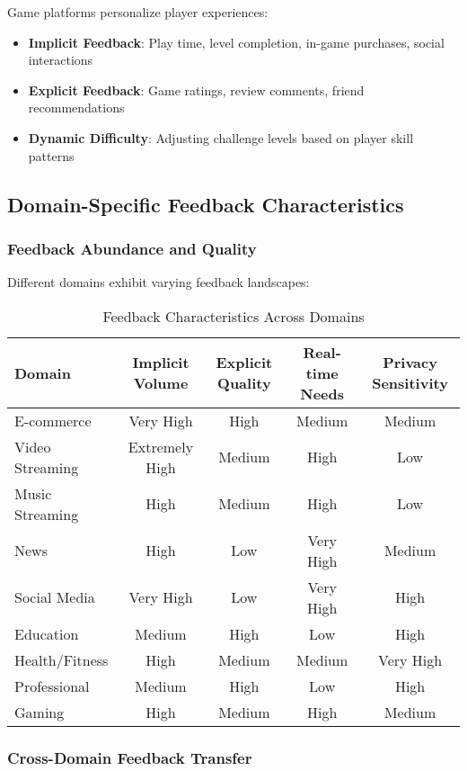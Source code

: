 Game platforms personalize player experiences:

\begin{itemize}
    \item \textbf{Implicit Feedback}: Play time, level completion, in-game purchases, social interactions
    \item \textbf{Explicit Feedback}: Game ratings, review comments, friend recommendations
    \item \textbf{Dynamic Difficulty}: Adjusting challenge levels based on player skill patterns
\end{itemize}

\subsection{Domain-Specific Feedback Characteristics}

\subsubsection{Feedback Abundance and Quality}

Different domains exhibit varying feedback landscapes:

\begin{table}[h]
\centering
\caption{Feedback Characteristics Across Domains}
\label{tab:domain_feedback}
\begin{tabular}{@{}lcccc@{}}
\toprule
Domain & Implicit Volume & Explicit Quality & Real-time Needs & Privacy Sensitivity \\
\midrule
E-commerce & Very High & High & Medium & Medium \\
Video Streaming & Extremely High & Medium & High & Low \\
Music Streaming & High & Medium & High & Low \\
News & High & Low & Very High & Medium \\
Social Media & Very High & Low & Very High & High \\
Education & Medium & High & Low & High \\
Health/Fitness & High & Medium & Medium & Very High \\
Professional & Medium & High & Low & High \\
Gaming & High & Medium & High & Medium \\
\bottomrule
\end{tabular}
\end{table}

\subsubsection{Cross-Domain Feedback Transfer}

